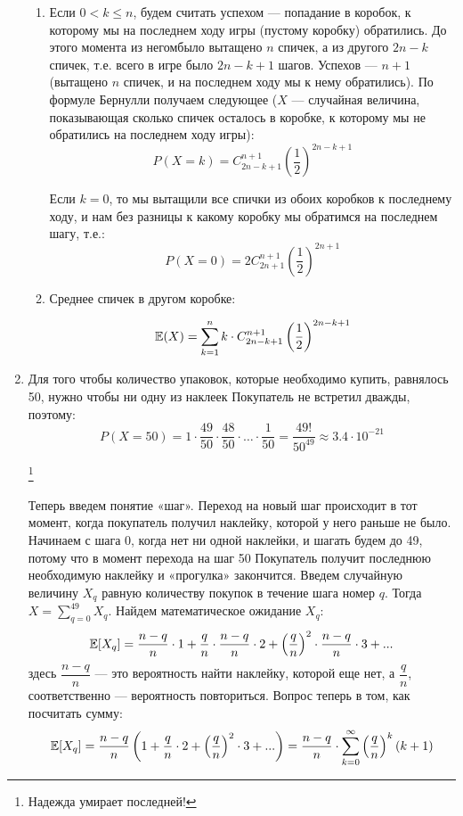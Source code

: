 \documentclass[12pt, a4paper]{article}\usepackage[]{graphicx}\usepackage[]{color}
\begin{document}
\begin{enumerate}
					\begin{enumerate}
						\item Если $0<k \leqslant n$, будем считать успехом — попадание в коробок, к которому мы на последнем ходу игры (пустому коробку) обратились. До этого момента из негомбыло вытащено $n$ спичек, а из другого $2n-k$ спичек, т.е. всего в игре было $2n - k + 1$ шагов. Успехов — $n + 1$ (вытащено $n$ спичек, и на последнем ходу мы к нему обратились). По формуле Бернулли получаем следующее ($X$ — случайная величина, показывающая сколько спичек осталось в коробке, к которому мы не обратились на последнем ходу игры):
						$$P(X = k) = C^{n+1}_{2n-k+1} \left(\dfrac{1}{2} \right)^{2n-k+1}$$

						Если $k = 0$, то мы вытащили все спички из обоих коробков к последнему ходу, и нам без разницы к какому коробку мы обратимся на последнем шагу, т.е.:
						$$P(X = 0) =2 C^{n+1}_{2n+1} \left(\dfrac{1}{2} \right)^{2n+1}$$

						\item Среднее спичек в другом коробке:

						$$\mathbb{E}(X) = \sum \limits_{k=1}^{n} k \cdot C^{n+1}_{2n-k+1} \left(\dfrac{1}{2} \right)^{2n-k+1}$$


					\end{enumerate}


					\item
					Для того чтобы количество упаковок, которые необходимо купить, равнялось 50, нужно чтобы ни одну из наклеек Покупатель не встретил дважды, поэтому:
					$$
					P(X=50) = 1\cdot\frac{49}{50}\cdot\frac{48}{50}\cdot\dots\cdot\frac{1}{50} = \frac{49!}{50^{49}} \approx 3.4\cdot
					10^{-21}$$ \vspace{-1cm}

					\hspace{10.5cm}\footnote[2]{Надежда умирает последней!}

					Теперь введем понятие «шаг». Переход на новый шаг происходит в тот момент, когда покупатель получил наклейку, которой у него раньше не было. Начинаем с шага 0, когда нет ни одной наклейки, и шагать будем до 49, потому что в момент перехода на шаг 50 Покупатель получит последнюю необходимую наклейку и «прогулка» закончится. Введем случайную величину $X_q$ равную количеству покупок в течение шага номер $q$. Тогда $X = \sum \limits_{q=0}^{49}X_q$.  Найдем математическое ожидание $X_q$:
					$$
					\mathbb{E}[X_q] = \frac{n-q}{n}\cdot 1 + \frac{q}{n}\cdot\frac{n-q}{n}\cdot 2 + \left(\frac{q}{n}\right)^2\cdot\frac{n-q}{n}\cdot 3 + ...
					$$
					здесь $\dfrac{n-q}{n}$ —  это вероятность найти наклейку, которой еще нет, а $\dfrac{q}{n}$, соответственно — вероятность повториться. Вопрос теперь в том, как посчитать сумму:
					$$
					\mathbb{E}[X_q] = \frac{n-q}{n}\left( 1 + \frac{q}{n}\cdot 2 + \left(\frac{q}{n}\right)^2 \cdot 3 + ...\right) = \frac{n-q}{n}\cdot\sum\limits_{k=0}^{\infty}\left(\frac{q}{n}\right)^k(k+1)
					$$


\end{enumerate}
\end{document}
